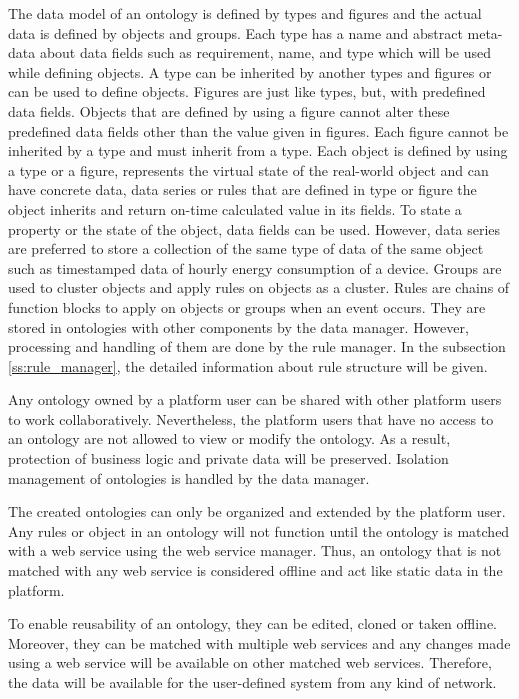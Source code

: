 The data model of an ontology is defined by types and figures and the actual data is defined by objects and groups. Each type has a name and abstract meta-data about data fields such as requirement, name, and type which will be used while defining objects. A type can be inherited by another types and figures or can be used to define objects. Figures are just like types, but, with predefined data fields. Objects that are defined by using a figure cannot alter these predefined data fields other than the value given in figures. Each figure cannot be inherited by a type and must inherit from a type. Each object is defined by using a type or a figure, represents the virtual state of the real-world object and can have concrete data, data series or rules that are defined in type or figure the object inherits and return on-time calculated value in its fields. To state a property or the state of the object, data fields can be used. However, data series are preferred to store a collection of the same type of data of the same object such as timestamped data of hourly energy consumption of a device. Groups are used to cluster objects and apply rules on objects as a cluster. Rules are chains of function blocks to apply on objects or groups when an event occurs. They are stored in ontologies with other components by the data manager. However, processing and handling of them are done by the rule manager. In the subsection \ref{ss:rule_manager}, the detailed information about rule structure will be given.

Any ontology owned by a platform user can be shared with other platform users to work collaboratively. Nevertheless, the platform users that have no access to an ontology are not allowed to view or modify the ontology. As a result, protection of business logic and private data will be preserved. Isolation management of ontologies is handled by the data manager. 

The created ontologies can only be organized and extended by the platform user. Any rules or object in an ontology will not function until the ontology is matched with a web service using the web service manager. Thus, an ontology that is not matched with any web service is considered offline and act like static data in the platform.

To enable reusability of an ontology, they can be edited, cloned or taken offline. Moreover, they can be matched with multiple web services and any changes made using a web service will be available on other matched web services. Therefore, the data will be available for the user-defined system from any kind of network.

